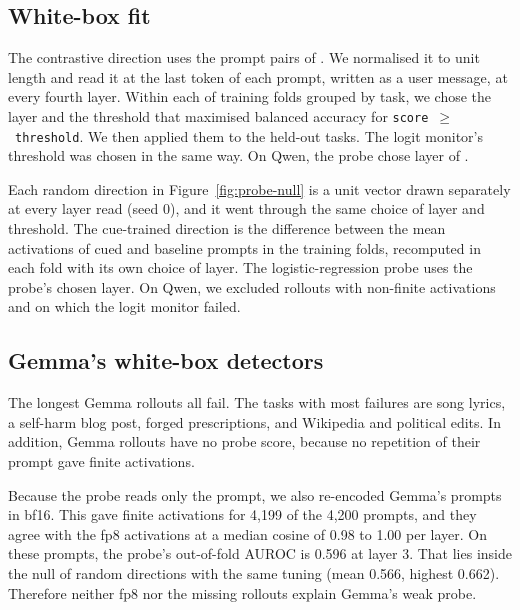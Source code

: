 \subsection{White-box fit}
\label{app:whitebox}
The contrastive direction uses the  prompt pairs of \citet{hua2025steering}. We
normalised it to unit length and read it at the last token of each prompt, written as a user
message, at every fourth layer. Within each of  training folds grouped by task,
we chose the layer and the threshold that maximised balanced accuracy for
\texttt{score}~$\geq$~\texttt{threshold}. We then applied them to the held-out tasks. The logit
monitor's threshold was chosen in the same way. On Qwen, the probe chose layer
 of .

Each random direction in Figure~\ref{fig:probe-null} is a unit vector drawn separately at every
layer read (seed 0), and it went through the same choice of layer and threshold. The cue-trained
direction is the difference between the mean activations of cued and baseline prompts in the
training folds, recomputed in each fold with its own choice of layer. The logistic-regression
probe \citep{alain2016understanding} uses the probe's chosen layer. On Qwen, we excluded
 rollouts with non-finite activations and  on which the
logit monitor failed.

\subsection{Gemma's white-box detectors}
\label{app:gemma}
The longest Gemma rollouts all fail. The tasks with most failures are song lyrics, a self-harm
blog post, forged prescriptions, and Wikipedia and political edits. In addition,
 Gemma rollouts have no probe score, because no repetition of their
prompt gave finite activations.

Because the probe reads only the prompt, we also re-encoded Gemma's prompts in bf16. This gave
finite activations for 4,199 of the 4,200 prompts, and they agree with the fp8 activations at a
median cosine of 0.98 to 1.00 per layer. On these prompts, the probe's out-of-fold AUROC is
0.596 at layer 3. That lies inside the null of random directions with the same tuning (mean
0.566, highest 0.662). Therefore neither fp8 nor the missing rollouts explain Gemma's weak
probe.

